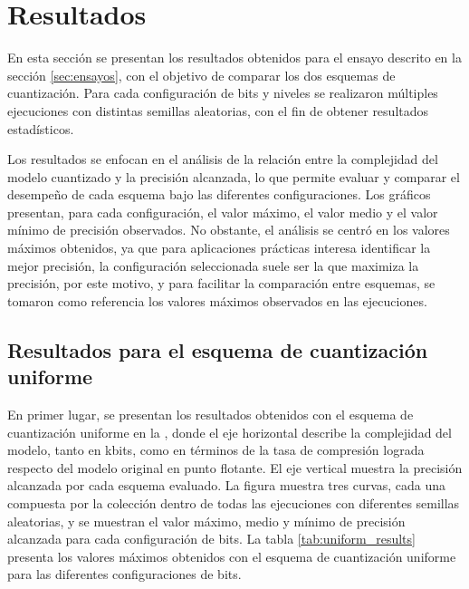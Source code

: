\section{Resultados}
\label{sec:resultados}

En esta sección se presentan los resultados obtenidos para el ensayo descrito en la sección \ref{sec:ensayos}, con el objetivo de comparar los dos esquemas de cuantización. Para cada configuración de bits y niveles se realizaron múltiples ejecuciones con distintas semillas aleatorias, con el fin de obtener resultados estadísticos.

Los resultados se enfocan en el análisis de la relación entre la complejidad del modelo cuantizado y la precisión alcanzada, lo que permite evaluar y comparar el desempeño de cada esquema bajo las diferentes configuraciones. Los gráficos presentan, para cada configuración, el valor máximo, el valor medio y el valor mínimo de precisión observados. No obstante, el análisis se centró en los valores máximos obtenidos, ya que para aplicaciones prácticas interesa identificar la mejor precisión, la configuración seleccionada suele ser la que maximiza la precisión, por este motivo, y para facilitar la comparación entre esquemas, se tomaron como referencia los valores máximos observados en las ejecuciones.

\subsection{Resultados para el esquema de cuantización uniforme}
\label{sec:uniform_results}

En primer lugar, se presentan los resultados obtenidos con el esquema de cuantización uniforme en la , donde el eje horizontal describe la complejidad del modelo, tanto en kbits, como en términos de la tasa de compresión lograda respecto del modelo original en punto flotante. El eje vertical muestra la precisión alcanzada por cada esquema evaluado. La figura muestra tres curvas, cada una compuesta por la colección dentro de todas las ejecuciones con diferentes semillas aleatorias, y se muestran el valor máximo, medio y mínimo de precisión alcanzada para cada configuración de bits. La tabla \ref{tab:uniform_results} presenta los valores máximos obtenidos con el esquema de cuantización uniforme para las diferentes configuraciones de bits.


